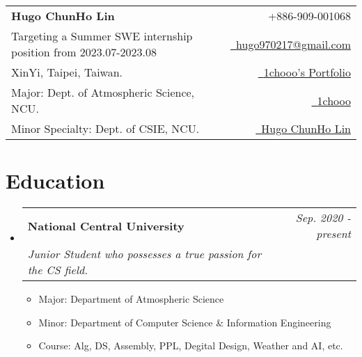 \documentclass[a4paper,11pt]{article}
\makeatletter
\newcommand{\resumeSubheading}[4]{
\vspace{0.5mm}\item
    \begin{tabular*}{0.98\textwidth}[t]{l@{\extracolsep{\fill}}r}
        \textbf{#1} & \textit{\footnotesize{#4}} \\
        \textit{\footnotesize{#3}} &  \footnotesize{#2}\\
    \end{tabular*}
    \vspace{-2.4mm}
}
\newcommand{\resumeSubHeadingListStart}{\begin{itemize}[leftmargin=*,labelsep=0mm]}
\newcommand{\resumeItemListStart}{\begin{justify}\begin{itemize}[leftmargin=3ex, rightmargin=2ex, noitemsep,labelsep=1.2mm,itemsep=0mm]\small}
\newcommand{\resumeSubHeadingListEnd}{\end{itemize}\vspace{2mm}}
\newcommand{\resumeItemListEnd}{\end{itemize}\end{justify}\vspace{-2mm}}
\newcommand{\name}{Hugo ChunHo Lin} %
\newcommand{\course}{Dept. of Atmospheric Science, NCU.} %
\newcommand{\phone}{909-001068} %
\newcommand{\emaila}{hugo970217@gmail.com} %
\newcommand{\myScore}{}
\makeatother
\begin{document}
\selectfont


\parbox{\textwidth}{
\begin{tabularx}{\linewidth}{L r} \\
  \textbf{\huge \name} & {\raisebox{0.0\height}{\footnotesize \faPhone}\ +886-\phone}\\ Targeting a Summer SWE internship position from 2023.07-2023.08
   & \href{mailto:\emaila}{\raisebox{0.0\height}{\footnotesize \faEnvelope}\ {\emaila}} \\
  XinYi, Taipei, Taiwan. & \href{https://sites.google.com/g.ncu.edu.tw/1chooo/portfolio}{\raisebox{0.0\height}{\footnotesize \faGlobe}\ {1chooo's Portfolio}}\\
  {Major: \course} &  \href{https://github.com/1chooo}{\raisebox{0.0\height}{\footnotesize \faGithub}\ {1chooo}} \\
  {Minor Specialty: Dept. of CSIE, NCU.} & \href{https://www.linkedin.com/in/1chooo/}{\raisebox{0.0\height}{\footnotesize \faLinkedin}\ {Hugo ChunHo Lin}}
\end{tabularx}
}




  
%

\section{\textbf{Education}}
  \resumeSubHeadingListStart
    \resumeSubheading
      { National Central University}{\myScore}
      {Junior Student who possesses a true passion for the CS field.}{Sep. 2020 - present}
      \vspace{-1.0mm}
      \resumeItemListStart
        \item {Major: Department of Atmospheric Science}
        \item {Minor: Department of Computer Science \& Information Engineering}
        \item {Course: Alg, DS, Assembly, PPL, Degital Design, Weather and AI, etc.}
      \resumeItemListEnd      
  \resumeSubHeadingListEnd
\vspace{-5.5mm}
\end{document}

